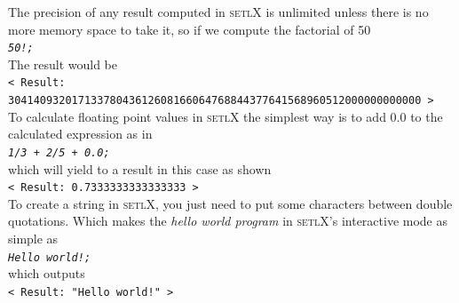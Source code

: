 \documentclass[11pt]{report}
\begin{document}
The precision of any result computed in \textsc{setlX} is unlimited unless there is no more memory space to take it, so if we compute the factorial of 50
\\[0.2cm]
\hspace*{1.3cm}
\texttt{\textsl{50!;}}
\\[0.2cm]
The result would be
\\[0.2cm]
\hspace*{0.6cm}
\texttt{< Result: 30414093201713378043612608166064768844377641568960512000000000000 >}
\\[0.2cm]
To calculate floating point values in \textsc{setlX} the simplest way is to add 0.0 to the calculated expression as in
\\[0.2cm]
\hspace*{1.3cm}
\texttt{\textsl{1/3 + 2/5 + 0.0;}}
\\[0.2cm]
which will yield to a result in this case as shown
\\[0.2cm]
\hspace*{1.3cm}
\texttt{< Result: 0.7333333333333333 >}
\\[0.2cm] 

To create a string in \textsc{setlX}, you just need to put some characters between double quotations. Which makes the \textsl{hello world program} in \textsc{setlX}'s interactive mode as simple as
\\[0.2cm]
\hspace*{1.3cm}
\texttt{\textsl{Hello world!;}}
\\[0.2cm]
which outputs 
\\[0.2cm]
\hspace*{1.3cm}
\texttt{< Result: "Hello world!" >}
\texttt{}
\\[0.2cm]
\end{document}
